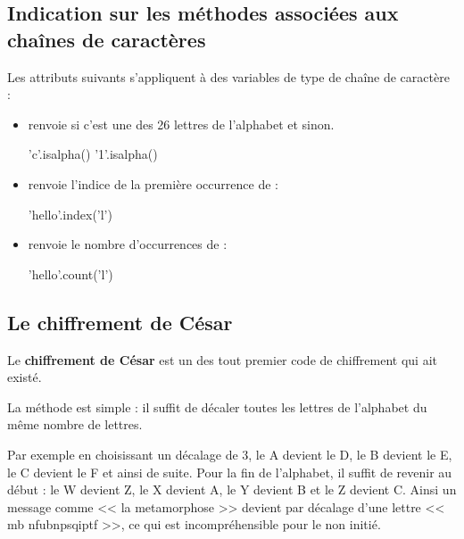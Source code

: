 

\setcounter{section}{1}

\subsection{Indication sur les méthodes associées aux chaînes de caractères}

Les attributs suivants s'appliquent à des variables de type de chaîne de caractère :
\begin{itemize}
\item {} renvoie  si c'est une des 26 lettres de l'alphabet et  sinon.
\begin{pyconsole}
'c'.isalpha()
'1'.isalpha()
\end{pyconsole}
\item {} renvoie l'indice de la première occurrence de  :
\begin{pyconsole}
'hello'.index('l')
\end{pyconsole}
\item {} renvoie le nombre d'occurrences de  :
\begin{pyconsole}
'hello'.count('l')
\end{pyconsole}
\end{itemize}

\subsection{Le chiffrement de César}



Le \textbf{chiffrement de César} est un des tout premier code de chiffrement qui ait existé. 

La méthode est simple : il suffit de décaler toutes les lettres de l'alphabet du même nombre de lettres. 



Par exemple en choisissant un décalage de 3, le A devient le D, le B devient le E, le C devient le F et ainsi de suite. Pour la fin de l'alphabet, il suffit de revenir au début : le W devient Z, le X devient A, le Y devient B et le Z devient C. Ainsi un message comme << la metamorphose >> devient par décalage d'une lettre << mb nfubnpsqiptf >>, ce qui est incompréhensible pour le non initié.





